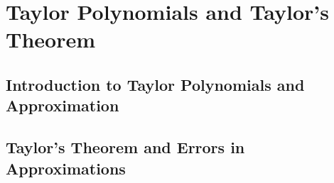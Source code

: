 \chapter{Taylor Polynomials and Taylor's Theorem}
\section{Introduction to Taylor Polynomials and Approximation}
\section{Taylor's Theorem and Errors in Approximations}